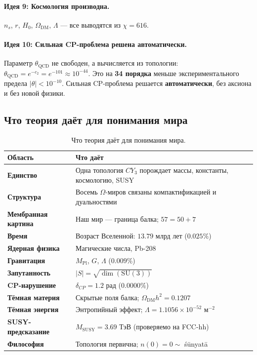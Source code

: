\documentclass[11pt,a4paper]{article}
\newcommand{\SU}{\mathrm{SU}}
\newcommand{\CY}{CY_3}
\newcommand{\Mpl}{M_{\text{Pl}}}
\newcommand{\MSUSY}{M_{\text{SUSY}}}
\theoremstyle{definition}
\begin{document}
\paragraph{Идея 9: Космология производна.}
$n_s$, $r$, $H_0$, $\Omega_{\text{DM}}$, $\Lambda$ — все 
выводятся из $\chi = 616$.

\paragraph{Идея 10: Сильная CP-проблема решена автоматически.}
Параметр $\theta_{\text{QCD}}$ не свободен, а вычисляется из
топологии: $\theta_{\text{QCD}} = e^{-c_2} = e^{-101} \approx 10^{-44}$.
Это на \textbf{34 порядка} меньше экспериментального предела
$|\theta| < 10^{-10}$. Сильная CP-проблема решается
\textbf{автоматически}, без аксиона и без новой физики.
  
\subsection{Что теория даёт для понимания мира}
\label{subsec:conclusions-what-gives}

\begin{table}[htbp]
\centering
\caption{Что теория даёт для понимания мира.}
\label{tab:conclusions-what-gives}
\begin{tabular}{p{4cm}p{8cm}}
\toprule
Область & Что даёт \\
\midrule
\textbf{Единство} & 
    Одна топология $\CY$ порождает массы, константы, 
    космологию, SUSY \\[0.3em]
\textbf{Структура} & 
    Восемь $\Omega$-миров связаны компактификацией и 
    дуальностями \\[0.3em]
\textbf{Мембранная картина} & 
    Наш мир — граница балка; $57 = 50 + 7$ \\[0.3em]
\textbf{Время} & 
    Возраст Вселенной: $13.79$ млрд лет ($0.025\%$) \\[0.3em]
\textbf{Ядерная физика} & 
    Магические числа, Pb-208 \\[0.3em]
\textbf{Гравитация} & 
    $\Mpl$, $G$, $\Lambda$ ($0.009\%$) \\[0.3em]
\textbf{Запутанность} & 
    $|S| = \sqrt{\dim(\SU(3))}$ \\[0.3em]
\textbf{CP-нарушение} & 
    $\delta_{CP} = 1.2$ рад ($0.0000\%$) \\[0.3em]
\textbf{Тёмная материя} & 
    Скрытые поля балка; $\Omega_{\text{DM}} h^2 = 0.1207$ \\[0.3em]
\textbf{Тёмная энергия} & 
    Энтропийный эффект; $\Lambda = 1.1056 \times 10^{-52}$ м$^{-2}$ \\[0.3em]
\textbf{SUSY-предсказание} & 
    $\MSUSY = 3.69$ ТэВ (проверяемо на FCC-hh) \\[0.3em]
\textbf{Философия} & 
    Топология первична; $n(0) = 0 \sim$ śūnyatā \\
\bottomrule
\end{tabular}
\end{table}
\end{document}
